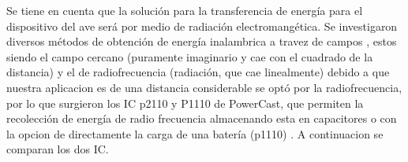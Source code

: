 Se tiene en cuenta que la solución para la transferencia de energía para el dispositivo del ave será por medio de radiación electromangética. 
Se investigaron diversos métodos de obtención de energía inalambrica a travez de campos , estos siendo el campo cercano (puramente imaginario y cae con el cuadrado de la distancia) y el de radiofrecuencia (radiación, que cae linealmente) debido a que nuestra aplicacion es de una distancia considerable se optó por la radiofrecuencia, por lo que surgieron los IC p2110 y P1110 de PowerCast,  que permiten la recolección de energía de radio frecuencia almacenando esta en capacitores o con la opcion de directamente la carga de una batería (p1110) . A continuacion se comparan los dos IC.

